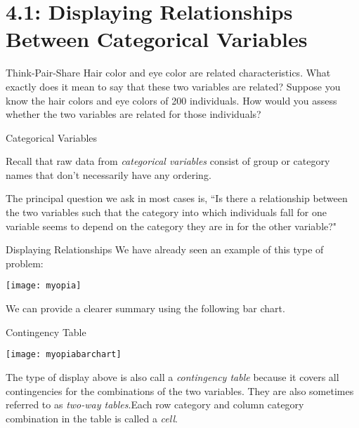 \documentclass[Lecture.tex]{subfiles}
\begin{document}
\section{4.1: Displaying Relationships Between Categorical Variables}

\begin{frame}{Think-Pair-Share}
Hair color and eye color are related characteristics.  What exactly does it mean to say that these two variables are related?  Suppose you know the hair colors and eye colors of 200 individuals.  How would you assess whether the two variables are related for those individuals?
\end{frame}

\begin{frame}{Categorical Variables}
\begin{defn}
Recall that raw data from {\it categorical variables} consist of group or category names that don't necessarily have any ordering.
\end{defn}\pause
The principal question we ask in most cases is, ``Is there a relationship between the two variables such that the category into which individuals fall for one variable seems to depend on the category they are in for the other variable?"
\end{frame}

\begin{frame}{Displaying Relationships}
We have already seen an example of this type of problem:
\begin{center}
\texttt{[image: myopia]}
\end{center}\pause
We can provide a clearer summary using the following bar chart.
\end{frame}
  
\begin{frame}{Contingency Table}
\begin{center}
\texttt{[image: myopiabarchart]}
\end{center}\pause
\begin{defn}
The type of display above is also call a {\it contingency table} because it covers all contingencies for the combinations of the two variables.  They are also sometimes referred to as {\it two-way tables}.\pause Each row category and column category combination in the table is called a {\it cell}.
\end{defn}
\end{frame}
\end{document}
